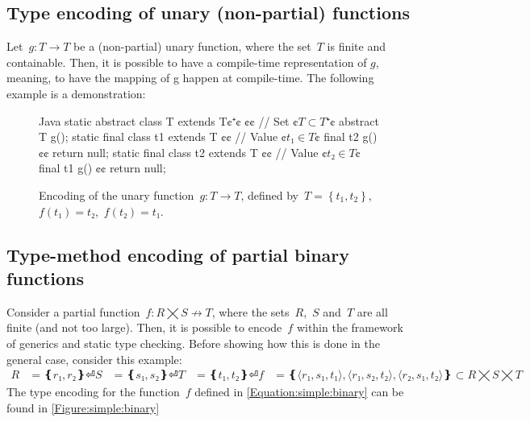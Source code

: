 \subsection{Type encoding of unary (non-partial) functions}
Let~$g: T \rightarrow T $ be a (non-partial) unary function,
  where the set~$T$ is finite and containable.
Then, it is possible to have a compile-time representation of $g$,
  meaning, to have the mapping of g happen at compile-time.
The following example is a demonstration:
\begin{figure}
  \begin{Code}{Java}
static abstract class T extends T¢$⁺$¢ {¢¢ // Set ¢$T⊂T⁺$¢
  abstract T g();
  static final class t1 extends T {¢¢ // Value ¢$t₁∈T$¢
    final t2 g() {¢¢ return null; }
  }
  static final class t2 extends T {¢¢ // Value ¢$t₂∈T$¢
    final t1 g() {¢¢ return null; }
  }
}
\end{Code}
  \caption{Encoding of the unary function~$g: T→T$,
  defined by~$T=\left\{ t_1,t_2 \right\}$,~$f(t₁)=t₂$,~$f(t₂)=t₁$.}
  \label{Figure:unary:function}
\end{figure}

\subsection{Type-method encoding of partial binary functions}
Consider a partial function~$f: R⨉S↛T$,
  where the sets~$R$,~$S$ and~$T$ are all finite (and not too large).
Then, it is possible to encode~$f$
  within the framework of \Java generics and static type checking.
Before showing how this is done in the general case, consider this example:
\begin{equation}
  \label{Equation:simple:binary}
\begin{split}
  R & = ❴ r₁, r₂❵⏎
  S & = ❴ s₁, s₂❵⏎
  T & = ❴ t₁, t₂❵⏎
  f & = ❴ ⟨r₁, s₁, t₁⟩, ⟨r₁, s₂, t₂⟩, ⟨r₂, s₁, t₂⟩ ❵ ⊂R⨉S⨉T
\end{split}
\end{equation}
The \Java type encoding for the function~$f$ defined in \cref{Equation:simple:binary}
  can be found in \cref{Figure:simple:binary}

